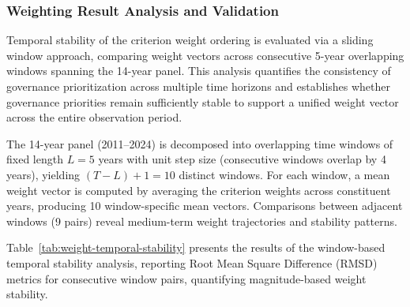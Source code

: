 \documentclass[12pt,a4paper]{article}
\begin{document}
\FloatBarrier

\subsubsection{Weighting Result Analysis and Validation}

Temporal stability of the criterion weight ordering is evaluated via a sliding window approach, comparing weight vectors across consecutive 5-year overlapping windows spanning the 14-year panel. This analysis quantifies the consistency of governance prioritization across multiple time horizons and establishes whether governance priorities remain sufficiently stable to support a unified weight vector across the entire observation period. 

The 14-year panel (2011--2024) is decomposed into overlapping time windows of fixed length $L = 5$ years with unit step size (consecutive windows overlap by 4 years), yielding $(T - L) + 1 = 10$ distinct windows. For each window, a mean weight vector is computed by averaging the criterion weights across constituent years, producing 10 window-specific mean vectors. Comparisons between adjacent windows (9 pairs) reveal medium-term weight trajectories and stability patterns.

Table~\ref{tab:weight-temporal-stability} presents the results of the window-based temporal stability analysis, reporting Root Mean Square Difference (RMSD) metrics for consecutive window pairs, quantifying magnitude-based weight stability.
\end{document}
